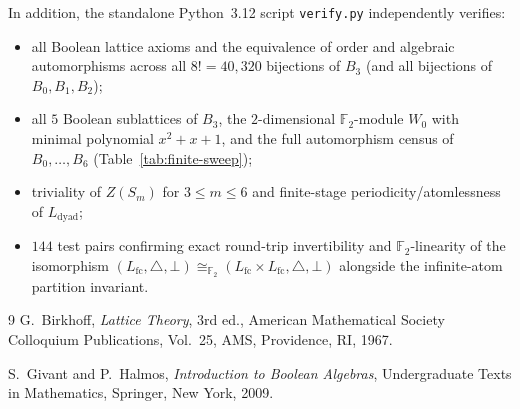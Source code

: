 \documentclass[11pt]{article}
\theoremstyle{definition}
\theoremstyle{remark}
\newcommand{\Ftwo}{\mathbb{F}_2}
\newcommand{\Ldyad}{L_{\mathrm{dyad}}}
\newcommand{\Lfc}{L_{\mathrm{fc}}}
\begin{document}
In addition, the standalone Python~3.12 script \texttt{verify.py} independently verifies:
\begin{itemize}
  \item all Boolean lattice axioms and the equivalence of order and algebraic automorphisms across all $8! = 40{,}320$ bijections of $B_3$ (and all bijections of $B_0, B_1, B_2$);
  \item all $5$ Boolean sublattices of $B_3$, the $2$-dimensional $\Ftwo$-module $W_0$ with minimal polynomial $x^2 + x + 1$, and the full automorphism census of $B_0, \dots, B_6$ (Table~\ref{tab:finite-sweep});
  \item triviality of $Z(S_m)$ for $3 \le m \le 6$ and finite-stage periodicity/atomlessness of $\Ldyad$;
  \item $144$ test pairs confirming exact round-trip invertibility and $\Ftwo$-linearity of the isomorphism $(\Lfc, \triangle, \bot) \cong_{\Ftwo} (\Lfc \times \Lfc, \triangle, \bot)$ alongside the infinite-atom partition invariant.
\end{itemize}

\begin{thebibliography}{9}
G.~Birkhoff, \emph{Lattice Theory}, 3rd ed., American Mathematical Society Colloquium Publications, Vol.~25, AMS, Providence, RI, 1967.

S.~Givant and P.~Halmos, \emph{Introduction to Boolean Algebras}, Undergraduate Texts in Mathematics, Springer, New York, 2009.
\end{thebibliography}
\end{document}
